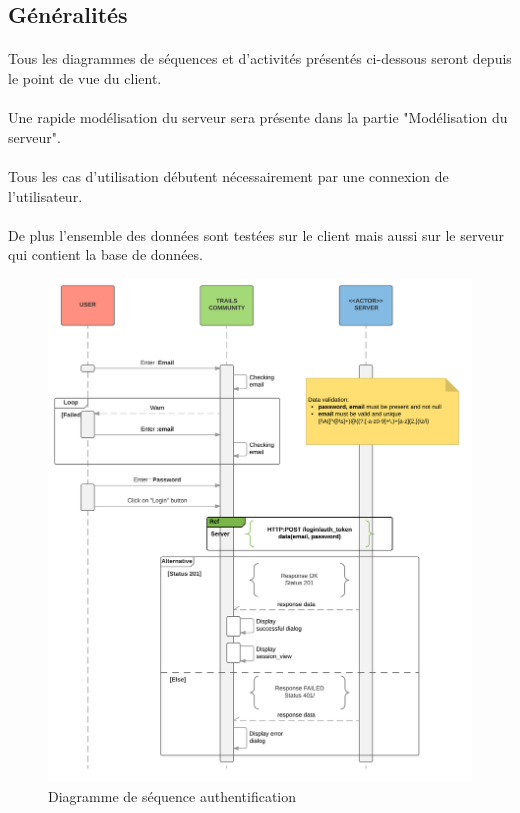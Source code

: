 \documentclass[titlepage, 12pt]{report}
\begin{document}
\subsection{Généralités}

\paragraph{}Tous les diagrammes de séquences et d'activités présentés ci-dessous seront depuis le point de vue du client.
\paragraph{}Une rapide modélisation du serveur sera présente dans la partie "Modélisation du serveur".
\paragraph{}Tous les cas d'utilisation débutent nécessairement par une connexion de l'utilisateur.
\paragraph{}De plus l'ensemble des données sont testées sur le client mais aussi sur le serveur qui contient la base de données.


\begin{figure}[!h]
\caption{Diagramme de séquence authentification}
\label{authentification_sequence_diagram}
\centering
\includegraphics[scale=0.7]{Images/diagram/login_sequence_diagram.png}
\end{figure}
\end{document}
